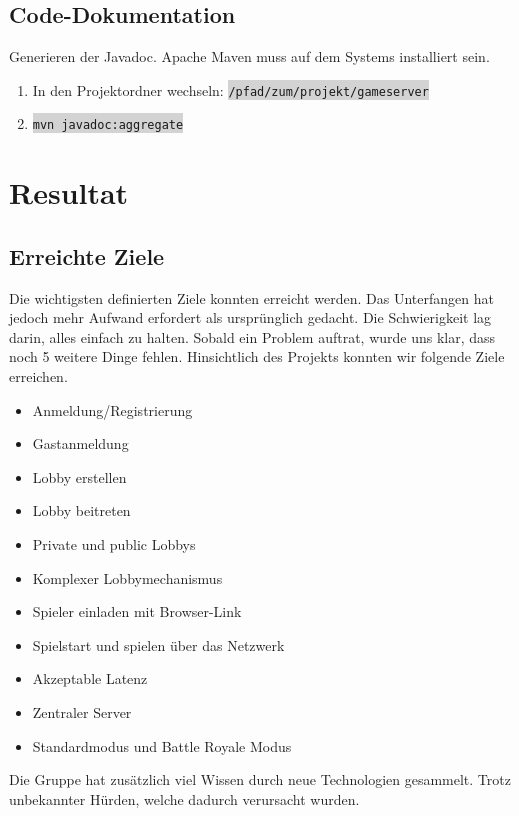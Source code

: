 \documentclass[11pt,ngerman]{article}
\newcommand{\inlinecode}[2]{\colorbox{lightgray}{\lstinline[language=#1]$#2$}}
\begin{document}
    \subsection{Code-Dokumentation}
    Generieren der Javadoc. \Gls{Apache Maven} muss auf dem Systems installiert sein.
    \begin{enumerate}
        \item In den Projektordner wechseln: \inlinecode{bash}{/pfad/zum/projekt/gameserver}
        \item \inlinecode{bash}{mvn javadoc:aggregate}
    \end{enumerate}



    \section{Resultat}

    \subsection{Erreichte Ziele}
    Die wichtigsten definierten Ziele konnten erreicht werden. Das Unterfangen hat jedoch mehr Aufwand erfordert als ursprünglich gedacht. Die Schwierigkeit lag darin, alles einfach zu halten. Sobald ein Problem auftrat, wurde uns klar, dass noch 5 weitere Dinge fehlen. \newline
    \newline
    \noindent Hinsichtlich des Projekts konnten wir folgende Ziele erreichen.

	\begin{itemize}
		\item Anmeldung/Registrierung
		\item Gastanmeldung
		\item Lobby erstellen
		\item Lobby beitreten
		\item Private und public Lobbys
		\item Komplexer Lobbymechanismus
		\item Spieler einladen mit Browser-Link
		\item Spielstart und spielen über das Netzwerk
		\item Akzeptable Latenz
		\item Zentraler Server
		\item Standardmodus und Battle Royale Modus
	\end{itemize}
    Die Gruppe hat zusätzlich viel Wissen durch neue Technologien gesammelt. Trotz unbekannter Hürden, welche dadurch verursacht wurden.
\end{document}
